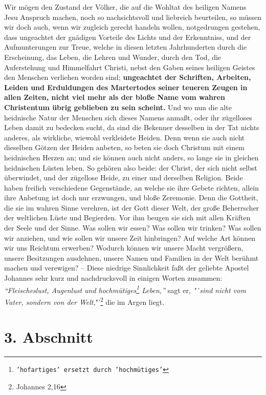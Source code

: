 \label{ref:01_02_urchristentum} Wir mögen den Zustand der Völker, die auf die Wohltat des heiligen Namens Jesu
Anspruch machen, noch so nachsichtsvoll und liebreich beurteilen, so müssen wir
doch auch, wenn wir zugleich gerecht handeln wollen, notgedrungen gestehen, dass
ungeachtet der gnädigen Vorteile des Lichts und der Erkenntniss, und der
Aufmunterungen zur Treue, welche in diesen letzten Jahrhunderten durch die
Erscheinung, das Leben, die Lehren und Wunder, durch den Tod, die Auferstehung
und Himmelfahrt Christi, nebst den Gaben seines heiligen Geistes den Menschen
verliehen worden sind; \textbf{ungeachtet der Schriften, Arbeiten, Leiden und
Erduldungen des Martertodes seiner teueren Zeugen in allen Zeiten, nicht viel
mehr als der bloße Name vom wahren Christentum übrig geblieben zu sein
scheint.} Und wo nun die alte heidnische Natur der Menschen sich dieses Namens
anmaßt, oder ihr zügelloses Leben damit zu bedecken sucht, da sind die Bekenner
desselben in der Tat nichts anderes, als wirkliche, wiewohl verkleidete Heiden.
Denn wenn sie auch nicht dieselben Götzen der Heiden anbeten, so beten sie doch
Christum mit einem heidnischen Herzen an; und sie können auch nicht anders, so
lange sie in gleichen heidnischen Lüsten leben. So gehören also beide: der
Christ, der sich nicht selbst überwindet, und der zügellose Heide, zu einer und
derselben Religion. Beide haben freilich verschiedene Gegenstände,
an welche sie ihre Gebete richten, allein ihre Anbetung ist doch nur erzwungen,
und bloße Zeremonie. Denn die Gottheit, die sie im wahren Sinne verehren, ist
der Gott dieser Welt, der große Beherrscher der weltlichen Lüste und Begierden.
Vor ihm beugen sie sich mit allen Kräften der Seele und der Sinne. Was sollen
wir essen? Was sollen wir trinken? Was sollen wir anziehen, und wie sollen wir
unsere Zeit hinbringen? Auf welche Art können wir uns Reichtum erwerben?
Wodurch können wir unsere Macht vergrößern, unsere Besitzungen ausdehnen, unsere
Namen und Familien in der Welt berühmt machen und verewigen? -- Diese niedrige
Sinnlichkeit faßt der geliebte Apostel Johannes sehr kurz und nachdrucksvoll in
einigen Worten zusammen:
\textit{"`Fleischeslust, Augenlust und hochmütiges\footnote{\texttt{'hofartiges' ersetzt durch 'hochmütiges'}}
Leben,"'} sagt er, \textit{"`sind nicht vom Vater, sondern von der Welt,}"'\footnote{Johannes 2,16}
die im Argen liegt.

\section{3. Abschnitt} \label{kap1_ab3}

